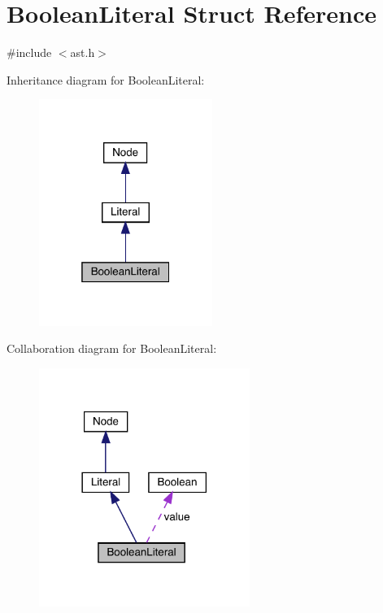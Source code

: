 \hypertarget{struct_boolean_literal}{}\section{Boolean\+Literal Struct Reference}
\label{struct_boolean_literal}


{\ttfamily \#include $<$ast.\+h$>$}



Inheritance diagram for Boolean\+Literal\+:\nopagebreak
\begin{figure}[H]
\begin{center}
\leavevmode
\includegraphics[width=160pt]{struct_boolean_literal__inherit__graph}
\end{center}
\end{figure}


Collaboration diagram for Boolean\+Literal\+:
\nopagebreak
\begin{figure}[H]
\begin{center}
\leavevmode
\includegraphics[width=194pt]{struct_boolean_literal__coll__graph}
\end{center}
\end{figure}
